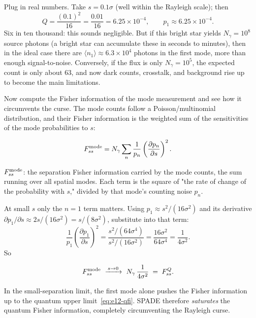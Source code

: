 Plug in real numbers. Take $s=0.1\sigma$ (well within the Rayleigh scale); then
\[
  Q=\frac{(0.1)^2}{16}=\frac{0.01}{16}=6.25\times10^{-4},
  \qquad p_1\approx6.25\times10^{-4}.
\]
Six in ten thousand: this sounds negligible. But if this bright star yields $N_\gamma=10^{8}$ source photons (a bright star can accumulate these in seconds to minutes), then in the ideal case there are $\langle n_1\rangle\approx6.3\times10^{4}$ photons in the first mode, more than enough signal-to-noise. Conversely, if the flux is only $N_\gamma=10^{5}$, the expected count is only about 63, and now dark counts, crosstalk, and background rise up to become the main limitations.

Now compute the Fisher information of the mode measurement and see how it circumvents the curse. The mode counts follow a Poisson/multinomial distribution, and their Fisher information is the weighted sum of the sensitivities of the mode probabilities to $s$:

\begin{equation}
  F_{ss}^{\rm mode}
  =N_\gamma\sum_{n}\frac{1}{p_n}
  \left(\frac{\partial p_n}{\partial s}\right)^{2}.
  \label{eq:e12-mode-fisher}
\end{equation}
\begin{formulaexplain}
$F_{ss}^{\rm mode}$: the separation Fisher information carried by the mode counts, the sum running over all spatial modes. Each term is the square of "the rate of change of the probability with $s$," divided by that mode's counting noise $p_n$.
\end{formulaexplain}

At small $s$ only the $n=1$ term matters. Using $p_1\approx s^2/(16\sigma^2)$ and its derivative $\partial p_1/\partial s\approx 2s/(16\sigma^2)=s/(8\sigma^2)$, substitute into that term:
\[
  \frac{1}{p_1}\left(\frac{\partial p_1}{\partial s}\right)^{2}
  =\frac{s^{2}/(64\sigma^{4})}{s^{2}/(16\sigma^{2})}
  =\frac{16\sigma^{2}}{64\sigma^{4}}
  =\frac{1}{4\sigma^{2}}.
\]
So

\begin{equation}
  F_{ss}^{\rm mode}\ \xrightarrow{\,s\to0\,}\ N_\gamma\,\frac{1}{4\sigma^{2}}
  \;=\;F_{ss}^{Q}.
  \label{eq:e12-mode-saturates}
\end{equation}
\begin{formulaexplain}
In the small-separation limit, the first mode alone pushes the Fisher information up to the quantum upper limit~\eqref{eq:e12-qfi}. SPADE therefore \emph{saturates} the quantum Fisher information, completely circumventing the Rayleigh curse.
\end{formulaexplain}

